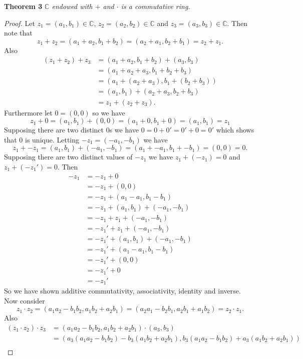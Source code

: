 \documentclass{article}
\begin{document}
\begin{flushleft}
\textbf{Theorem 3}
\textsl{$\mathbb{C}$ endowed with $+$ and $\cdot$ is a commutative ring.}
\begin{proof}
Let $z_1 = (a_1,b_1) \in \mathbb{C}$, $z_2 = (a_2,b_2) \in \mathbb{C}$ and $z_3 = (a_3,b_3) \in \mathbb{C}$. Then note that
\[
z_1 + z_2 = (a_1 + a_2, b_1 + b_2) = (a_2 + a_1, b_2 + b_1) = z_2 + z_1.
\]
Also
\begin{align*}
(z_1 + z_2) + z_3 &= (a_1 + a_2, b_1 + b_2) + (a_3, b_3) \\
			    &= (a_1 + a_2 + a_3, b_1 + b_2 + b_3) \\
			    &= (a_1 + (a_2 + a_3), b_1 + (b_2 + b_3)) \\
			    &= (a_1, b_1) + (a_2 + a_3, b_2 + b_3) \\
			    &= z_1 + (z_2 + z_3).
\end{align*}
Furthermore let $0 = (0, 0)$ so we have
\[
z_1 + 0 = (a_1, b_1) + (0, 0) = (a_1 + 0, b_1 + 0) = (a_1, b_1) = z_1
\]
Supposing there are two distinct $0$s we have $0 = 0 + 0' = 0' + 0 = 0'$ which shows that $0$ is unique. Letting $-z_1 = (-a_1, -b_1)$ we have
\[
z_1 + -z_1 = (a_1, b_1) + (-a_1, -b_1) = (a_1 + -a_1, b_1 + -b_1) = (0, 0) = 0.
\]
Supposing there are two distinct values of $-z_1$ we have $z_1 + (-z_1) = 0$ and $z_1 + (-z_1') = 0$. Then
\begin{align*}
-z_1 &= -z_1 + 0 \\
	&= -z_1 + (0, 0) \\
	&= -z_1 + (a_1 - a_1, b_1 - b_1) \\
	&= -z_1 + (a_1, b_1) + (-a_1, -b_1) \\
	&= -z_1 + z_1 + (-a_1, -b_1) \\
	&= -z_1' + z_1 + (-a_1, -b_1) \\
	&= -z_1' + (a_1, b_1) + (-a_1, -b_1) \\
	&= -z_1' + (a_1 - a_1, b_1 - b_1) \\
	&= -z_1' + (0,0) \\
	&= -z_1' + 0 \\
	&= -z_1'
\end{align*}
So we have shown additive commutativity, associativity, identity and inverse. Now consider
\[
z_1 \cdot z_2 = (a_1a_2 - b_1b_2, a_1b_2 + a_2b_1) = (a_2a_1 - b_2b_1, a_2b_1 + a_1b_2) = z_2 \cdot z_1.
\]
Also
\begin{align*}
(z_1 \cdot z_2) \cdot z_3 &= (a_1a_2 - b_1b_2, a_1b_2 + a_2b_1) \cdot (a_3, b_3) \\
	&= (a_3(a_1a_2 - b_1b_2) - b_3(a_1b_2 + a_2b_1), b_3(a_1a_2 - b_1b_2) + a_3(a_1b_2 + a_2b_1)) \\

\end{align*}
\end{proof}
\end{flushleft}
\end{document}
